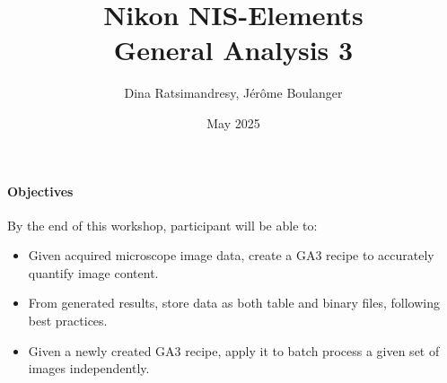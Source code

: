 \documentclass[a4paper,DIV=17,dvipsnames,headsepline]{scrartcl}
\title{Nikon NIS-Elements\\ General Analysis 3}
\author{Dina Ratsimandresy, Jérôme Boulanger}
\date{May 2025}
\begin{document}
\maketitle

\paragraph{Objectives}
By the end of this workshop, participant will be able to:
\begin{itemize}
\item Given acquired microscope image data, create a GA3 recipe to accurately quantify image content.
\item From generated results, store data as both table and binary files, following best practices.
\item Given a newly created GA3 recipe, apply it to batch process a given set of images independently.
\end{itemize}

\tableofcontents \newpage

  \newpage
 \newpage
 \newpage
 \newpage
 \newpage
 \newpage
 \newpage
 \newpage
 \newpage

\appendix
\printendnotes
\end{document}
